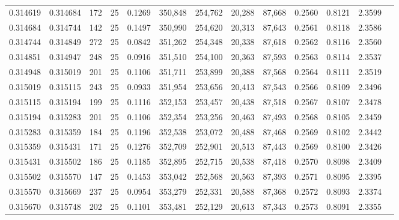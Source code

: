 \begin{tabular}{rrrrrrrrrrrrr}
0.314619 & 0.314684 &   172 &  25 &                                     0.1269 & 350,848 & 254,762 &  20,288 &  87,668 & 0.2560 & 0.8121 & 2.3599 \\
0.314684 & 0.314744 &   142 &  25 &                                     0.1497 & 350,990 & 254,620 &  20,313 &  87,643 & 0.2561 & 0.8118 & 2.3586 \\
0.314744 & 0.314849 &   272 &  25 &                                     0.0842 & 351,262 & 254,348 &  20,338 &  87,618 & 0.2562 & 0.8116 & 2.3560 \\
0.314851 & 0.314947 &   248 &  25 &                                     0.0916 & 351,510 & 254,100 &  20,363 &  87,593 & 0.2563 & 0.8114 & 2.3537 \\
0.314948 & 0.315019 &   201 &  25 &                                     0.1106 & 351,711 & 253,899 &  20,388 &  87,568 & 0.2564 & 0.8111 & 2.3519 \\
0.315019 & 0.315115 &   243 &  25 &                                     0.0933 & 351,954 & 253,656 &  20,413 &  87,543 & 0.2566 & 0.8109 & 2.3496 \\
0.315115 & 0.315194 &   199 &  25 &                                     0.1116 & 352,153 & 253,457 &  20,438 &  87,518 & 0.2567 & 0.8107 & 2.3478 \\
0.315194 & 0.315283 &   201 &  25 &                                     0.1106 & 352,354 & 253,256 &  20,463 &  87,493 & 0.2568 & 0.8105 & 2.3459 \\
0.315283 & 0.315359 &   184 &  25 &                                     0.1196 & 352,538 & 253,072 &  20,488 &  87,468 & 0.2569 & 0.8102 & 2.3442 \\
0.315359 & 0.315431 &   171 &  25 &                                     0.1276 & 352,709 & 252,901 &  20,513 &  87,443 & 0.2569 & 0.8100 & 2.3426 \\
0.315431 & 0.315502 &   186 &  25 &                                     0.1185 & 352,895 & 252,715 &  20,538 &  87,418 & 0.2570 & 0.8098 & 2.3409 \\
0.315502 & 0.315570 &   147 &  25 &                                     0.1453 & 353,042 & 252,568 &  20,563 &  87,393 & 0.2571 & 0.8095 & 2.3395 \\
0.315570 & 0.315669 &   237 &  25 &                                     0.0954 & 353,279 & 252,331 &  20,588 &  87,368 & 0.2572 & 0.8093 & 2.3374 \\
0.315670 & 0.315748 &   202 &  25 &                                     0.1101 & 353,481 & 252,129 &  20,613 &  87,343 & 0.2573 & 0.8091 & 2.3355 \\

\end{tabular}
